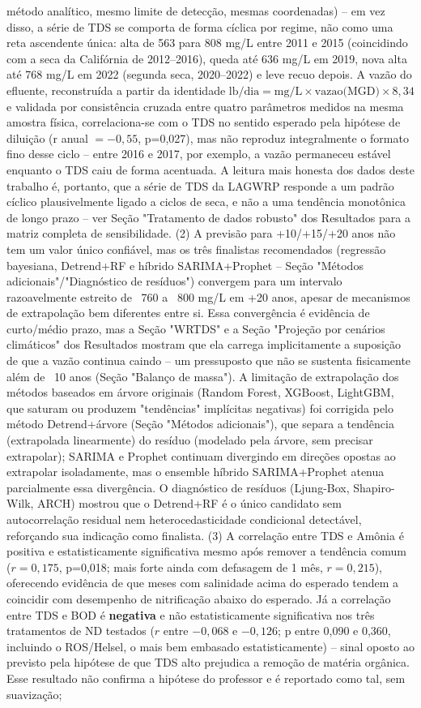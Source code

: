método analítico, mesmo limite de detecção, mesmas coordenadas) -- em vez disso, a série de TDS se comporta de forma cíclica por regime, não como uma reta ascendente única: alta de 563 para 808 mg/L entre 2011 e 2015 (coincidindo com a seca da Califórnia de 2012--2016), queda até 636 mg/L em 2019, nova alta até 768 mg/L em 2022 (segunda seca, 2020--2022) e leve recuo depois. A vazão do efluente, reconstruída a partir da identidade $\text{lb/dia} = \text{mg/L} \times \text{vazao(MGD)} \times 8,34$ e validada por consistência cruzada entre quatro parâmetros medidos na mesma amostra física, correlaciona-se com o TDS no sentido esperado pela hipótese de diluição (r anual $=-0{,}55$, p=0,027), mas não reproduz integralmente o formato fino desse ciclo -- entre 2016 e 2017, por exemplo, a vazão permaneceu estável enquanto o TDS caiu de forma acentuada. A leitura mais honesta dos dados deste trabalho é, portanto, que a série de TDS da LAGWRP responde a um padrão cíclico plausivelmente ligado a ciclos de seca, e não a uma tendência monotônica de longo prazo -- ver Seção "Tratamento de dados robusto" dos Resultados para a matriz completa de sensibilidade. (2) A previsão para +10/+15/+20 anos não tem um valor único confiável, mas os três finalistas recomendados (regressão bayesiana, Detrend+RF e híbrido SARIMA+Prophet -- Seção "Métodos adicionais"/"Diagnóstico de resíduos") convergem para um intervalo razoavelmente estreito de ~760 a ~800 mg/L em +20 anos, apesar de mecanismos de extrapolação bem diferentes entre si. Essa convergência é evidência de curto/médio prazo, mas a Seção "WRTDS" e a Seção "Projeção por cenários climáticos" dos Resultados mostram que ela carrega implicitamente a suposição de que a vazão continua caindo -- um pressuposto que não se sustenta fisicamente além de ~10 anos (Seção "Balanço de massa"). A limitação de extrapolação dos métodos baseados em árvore originais (Random Forest, XGBoost, LightGBM, que saturam ou produzem "tendências" implícitas negativas) foi corrigida pelo método Detrend+árvore (Seção "Métodos adicionais"), que separa a tendência (extrapolada linearmente) do resíduo (modelado pela árvore, sem precisar extrapolar); SARIMA e Prophet continuam divergindo em direções opostas ao extrapolar isoladamente, mas o ensemble híbrido SARIMA+Prophet atenua parcialmente essa divergência. O diagnóstico de resíduos (Ljung-Box, Shapiro-Wilk, ARCH) mostrou que o Detrend+RF é o único candidato sem autocorrelação residual nem heterocedasticidade condicional detectável, reforçando sua indicação como finalista. (3) A correlação entre TDS e Amônia é positiva e estatisticamente significativa mesmo após remover a tendência comum ($r=0{,}175$, p=0,018; mais forte ainda com defasagem de 1 mês, $r=0{,}215$), oferecendo evidência de que meses com salinidade acima do esperado tendem a coincidir com desempenho de nitrificação abaixo do esperado. Já a correlação entre TDS e BOD é \textbf{negativa} e não estatisticamente significativa nos três tratamentos de ND testados ($r$ entre $-0{,}068$ e $-0{,}126$; p entre 0,090 e 0,360, incluindo o ROS/Helsel, o mais bem embasado estatisticamente) -- sinal oposto ao previsto pela hipótese de que TDS alto prejudica a remoção de matéria orgânica. Esse resultado não confirma a hipótese do professor e é reportado como tal, sem suavização; 